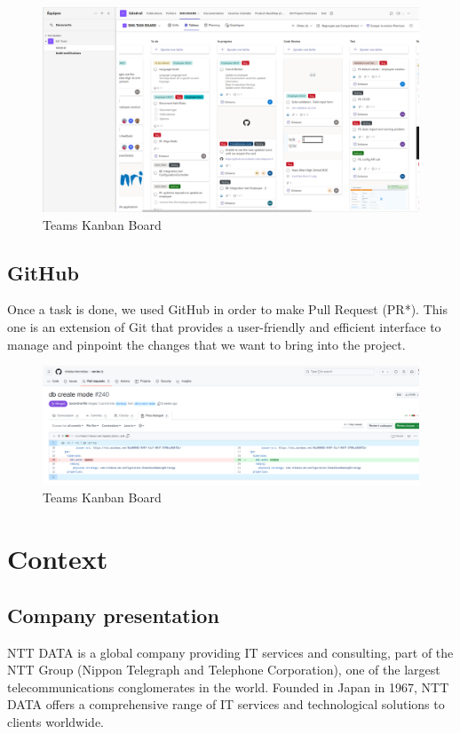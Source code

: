 \documentclass[12pt,a4paper,table,english]{article}
\begin{document}
	\begin{figure}[h!]
		\centering
		\includegraphics[width=0.8\linewidth]{Image/teams}
		\caption{Teams Kanban Board}
		\label{fig:Teams Kanban Board}
	\end{figure}
	
	\subsection{GitHub}
	
	Once a task is done, we used GitHub in order to make Pull Request (PR*). This one is an extension of Git that provides a user-friendly and efficient interface to manage and pinpoint the changes that we want to bring into the project.
	
	\begin{figure}[h!]
		\centering
		\includegraphics[width=0.8\linewidth]{Image/github}
		\caption{Teams Kanban Board}
		\label{fig:Teams Kanban Board}
	\end{figure}
	\pagebreak
	
	
	\section{Context}

	\subsection{Company presentation}
	
	NTT DATA is a global company providing IT services and consulting, part of the NTT Group (Nippon Telegraph and Telephone Corporation), one of the largest telecommunications conglomerates in the world. Founded in Japan in 1967, NTT DATA offers a comprehensive range of IT services and technological solutions to clients worldwide.\\
	
\end{document}
